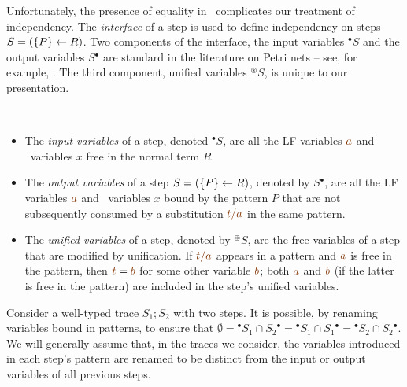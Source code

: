 Unfortunately, the presence of equality in \sls~complicates our
treatment of independency. The {\it interface} of a step is used to
define independency on steps $S = (\{{P}\} \leftarrow {R})$. Two components of
the interface, the input variables ${^\bullet}S$ and the output
variables $S{^\bullet}$ are standard in the literature on Petri nets
-- see, for example, \cite[p.~553]{murata89petri}. The third component,
unified variables ${^\circledast}S$, is unique to our presentation.
\bigskip
\begin{definition}~
\begin{itemize}
\item The {\em input variables} of a step, denoted ${^\bullet}S$, are
  all the LF variables $\lf{a}$ and \sls~variables $x$ free in the
  normal term $R$.

\item The {\em output variables} of a step $S = (\{{P}\} \leftarrow {R})$,
  denoted by $S{^\bullet}$, are all the LF variables $\lf{a}$ and
  \sls~variables $x$ bound by the pattern $P$ that are not
  subsequently consumed by a substitution $\lf{t/a}$ in the same
  pattern.

\item The {\em unified variables} of a step, denoted by ${^\circledast}S$, are
  the free variables of a step that are modified by unification. If
  $\lf{t/a}$ appears in a pattern and $\lf{a}$ is free in the pattern,
  then $\lf{t} = \lf{b}$ for some other variable $\lf{b}$; both
  $\lf{a}$ and $\lf{b}$ (if the latter is free in the pattern) are
  included in the step's unified variables.
\end{itemize}
\end{definition}
\bigskip

Consider a well-typed trace $S_1; S_2$ with two steps. It is possible,
by renaming variables bound in patterns, to ensure that $\emptyset =
{^\bullet}S_1 \cap S_2{^\bullet} = {^\bullet}S_1 \cap S_1{^\bullet} =
{^\bullet}S_2 \cap S_2{^\bullet}$. We will generally assume that, in the
traces we consider, the variables introduced in each step's pattern 
are renamed
to be distinct from the input or output variables of all previous steps.

